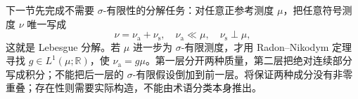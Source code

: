 下一节先完成不需要 \(\sigma\)-有限性的分解任务：对任意正参考测度 \(\mu\)，把任意符号测度 \(\nu\) 唯一写成
\[
\nu=\nu_{\mathrm a}+\nu_{\mathrm s},\quad
\nu_{\mathrm a}\ll\mu,\quad\nu_{\mathrm s}\perp\mu,
\]
这就是 Lebesgue 分解。若 \(\mu\) 进一步为 \(\sigma\)-有限测度，才用 Radon--Nikodym 定理寻找 \(g\in L^1(\mu;\mathbb R)\)，使 \(\nu_{\mathrm a}=g\mu\)。第一层分开两种质量，第二层把绝对连续部分写成积分；不能把后一层的 \(\sigma\)-有限假设倒加到前一层。将保证两种成分没有非零重叠；存在性则需要实际构造，不能由术语分类本身推出。
